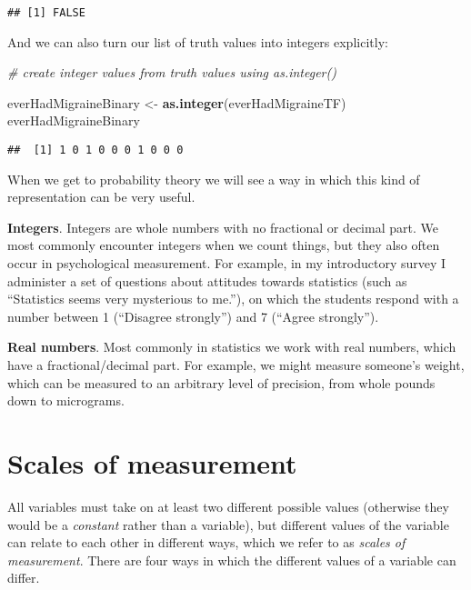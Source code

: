 \documentclass[]{book}
\newenvironment{Shaded}{\begin{snugshade}}{\end{snugshade}}
\newcommand{\KeywordTok}[1]{\textcolor[rgb]{0.13,0.29,0.53}{\textbf{#1}}}
\newcommand{\StringTok}[1]{\textcolor[rgb]{0.31,0.60,0.02}{#1}}
\newcommand{\CommentTok}[1]{\textcolor[rgb]{0.56,0.35,0.01}{\textit{#1}}}
\newcommand{\NormalTok}[1]{#1}
\theoremstyle{definition}
\theoremstyle{definition}
\theoremstyle{definition}
\theoremstyle{remark}
\begin{document}
\begin{verbatim}
## [1] FALSE
\end{verbatim}

And we can also turn our list of truth values into integers explicitly:

\begin{Shaded}
\begin{Highlighting}[]
\CommentTok{# create integer values from truth values using as.integer()}

\NormalTok{everHadMigraineBinary <-}\StringTok{ }\KeywordTok{as.integer}\NormalTok{(everHadMigraineTF)}
\NormalTok{everHadMigraineBinary}
\end{Highlighting}
\end{Shaded}

\begin{verbatim}
##  [1] 1 0 1 0 0 0 1 0 0 0
\end{verbatim}

When we get to probability theory we will see a way in which this kind
of representation can be very useful.

\textbf{Integers}. Integers are whole numbers with no fractional or
decimal part. We most commonly encounter integers when we count things,
but they also often occur in psychological measurement. For example, in
my introductory survey I administer a set of questions about attitudes
towards statistics (such as ``Statistics seems very mysterious to
me.''), on which the students respond with a number between 1
(``Disagree strongly'') and 7 (``Agree strongly'').

\textbf{Real numbers}. Most commonly in statistics we work with real
numbers, which have a fractional/decimal part. For example, we might
measure someone's weight, which can be measured to an arbitrary level of
precision, from whole pounds down to micrograms.

\section{Scales of measurement}\label{scales-of-measurement}

All variables must take on at least two different possible values
(otherwise they would be a \emph{constant} rather than a variable), but
different values of the variable can relate to each other in different
ways, which we refer to as \emph{scales of measurement}. There are four
ways in which the different values of a variable can differ.
\end{document}
